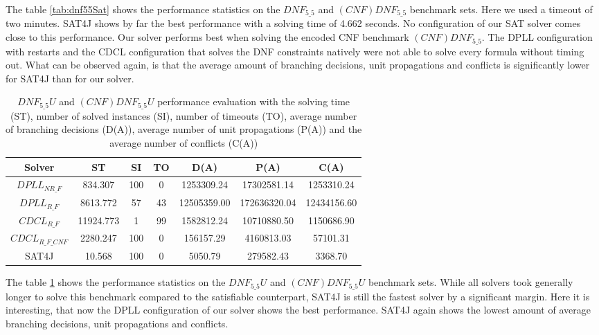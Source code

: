The table \ref{tab:dnf55Sat} shows the performance statistics on the $DNF_{5\_5}$ and $(CNF)DNF_{5\_5}$ benchmark sets. Here we used a timeout of two minutes. SAT4J shows by far the best performance with a solving time of 4.662 seconds. No configuration of our SAT solver comes close to this performance. Our solver performs best when solving the encoded CNF benchmark $(CNF)DNF_{5\_5}$. The DPLL configuration with restarts and the CDCL configuration that solves the DNF constraints natively were not able to solve every formula without timing out. What can be observed again, is that the average amount of branching decisions, unit propagations and conflicts is significantly lower for SAT4J than for our solver.


\begin{table}[!htb]
\centering
\caption[$DNF_{5\_5}U$ and $(CNF)DNF_{5\_5}U$ performance evaluation]{$DNF_{5\_5}U$ and $(CNF)DNF_{5\_5}U$ performance evaluation with the solving time (ST), number of solved instances (SI), number of timeouts (TO), average number of branching decisions (D(A)), average number of unit propagations (P(A)) and the average number of conflicts (C(A))}
\label{tab:dnf55Unsat}
\begin{tabular}{|c|c|c|c|c|c|c|}
\hline
Solver & ST & SI & TO & D(A) & P(A) & C(A)\\ 
\hline
$DPLL_{NR\_F}$ & 834.307 & 100 & 0 & 1253309.24 & 17302581.14 & 1253310.24 \\ 
\hline
$DPLL_{R\_F}$ & 8613.772 & 57 & 43 & 12505359.00 & 172636320.04 & 12434156.60 \\ 
\hline
$CDCL_{R\_F}$ & 11924.773 & 1 & 99 & 1582812.24 & 10710880.50 & 1150686.90 \\ 
\hline
$CDCL_{R\_F\_CNF}$ & 2280.247 & 100 & 0 & 156157.29 & 4160813.03 & 57101.31 \\ 
\hline
SAT4J & 10.568 & 100 & 0 & 5050.79 & 279582.43 & 3368.70 \\ 
\hline
\end{tabular}
\end{table}

The table \ref{tab:dnf55Unsat} shows the performance statistics on the $DNF_{5\_5}U$ and $(CNF)DNF_{5\_5}U$ benchmark sets. While all solvers took generally longer to solve this benchmark compared to the satisfiable counterpart, SAT4J is still the fastest solver by a significant margin. Here it is interesting, that now the DPLL configuration of our solver shows the best performance. SAT4J again shows the lowest amount of average branching decisions, unit propagations and conflicts.

